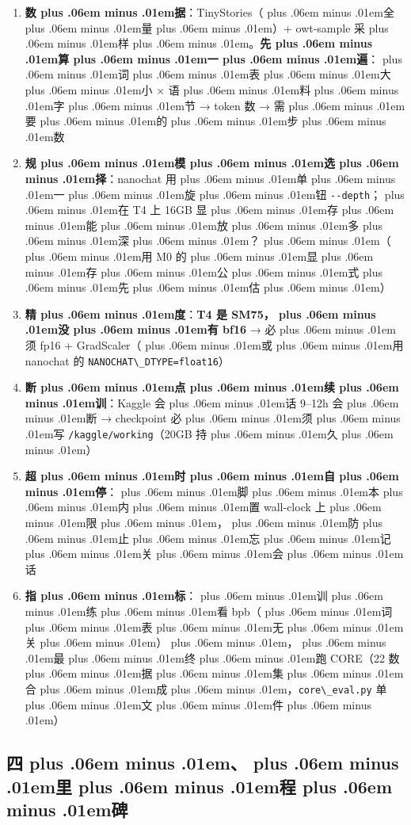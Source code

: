 \documentclass[
]{article}
\newcommand{\passthrough}[1]{#1}
\providecommand{\tightlist}{%
  \setlength{\itemsep}{0pt}\setlength{\parskip}{0pt}}
\def\zh#1{{\zhfont #1}}
\def\sym#1{{\symfont #1}}
\def\zhglue{\hskip0pt plus .06em minus .01em}
\begin{document}
\begin{enumerate}
\def\labelenumi{\arabic{enumi}.}
\tightlist
\item
  \textbf{\zh{数\zhglue 据}}\zh{：}TinyStories\zh{（\zhglue 全\zhglue 量\zhglue ）}+ owt-sample \zh{采\zhglue 样\zhglue 。}\textbf{\zh{先\zhglue 算\zhglue 一\zhglue 遍}}\zh{：\zhglue 词\zhglue 表\zhglue 大\zhglue 小} \sym{×} \zh{语\zhglue 料\zhglue 字\zhglue 节} \sym{→} token \zh{数} \sym{→} \zh{需\zhglue 要\zhglue 的\zhglue 步\zhglue 数}
\item
  \textbf{\zh{规\zhglue 模\zhglue 选\zhglue 择}}\zh{：}nanochat \zh{用\zhglue 单\zhglue 一\zhglue 旋\zhglue 钮} \passthrough{\lstinline!--depth!}\zh{；\zhglue 在} T4 \zh{上} 16GB \zh{显\zhglue 存\zhglue 能\zhglue 放\zhglue 多\zhglue 深\zhglue ？\zhglue （\zhglue 用} M0 \zh{的\zhglue 显\zhglue 存\zhglue 公\zhglue 式\zhglue 先\zhglue 估\zhglue ）}
\item
  \textbf{\zh{精\zhglue 度}}\zh{：}\textbf{T4 \zh{是} SM75\zh{，\zhglue 没\zhglue 有} bf16} \sym{→} \zh{必\zhglue 须} fp16 + GradScaler\zh{（\zhglue 或\zhglue 用} nanochat \zh{的} \passthrough{\lstinline!NANOCHAT\_DTYPE=float16!}\zh{）}
\item
  \textbf{\zh{断\zhglue 点\zhglue 续\zhglue 训}}\zh{：}Kaggle \zh{会\zhglue 话} 9--12h \zh{会\zhglue 断} \sym{→} checkpoint \zh{必\zhglue 须\zhglue 写} \passthrough{\lstinline!/kaggle/working!}\zh{（}20GB \zh{持\zhglue 久\zhglue ）}
\item
  \textbf{\zh{超\zhglue 时\zhglue 自\zhglue 停}}\zh{：\zhglue 脚\zhglue 本\zhglue 内\zhglue 置} wall-clock \zh{上\zhglue 限\zhglue ，\zhglue 防\zhglue 止\zhglue 忘\zhglue 记\zhglue 关\zhglue 会\zhglue 话}
\item
  \textbf{\zh{指\zhglue 标}}\zh{：\zhglue 训\zhglue 练\zhglue 看} bpb\zh{（\zhglue 词\zhglue 表\zhglue 无\zhglue 关\zhglue ）\zhglue ，\zhglue 最\zhglue 终\zhglue 跑} CORE\zh{（}22 \zh{数\zhglue 据\zhglue 集\zhglue 合\zhglue 成\zhglue ，}\passthrough{\lstinline!core\_eval.py!} \zh{单\zhglue 文\zhglue 件\zhglue ）}
\end{enumerate}

\subsection{\zh{四\zhglue 、\zhglue 里\zhglue 程\zhglue 碑}}\label{ux56dbux91ccux7a0bux7891-2}
\end{document}
